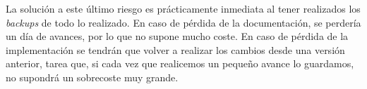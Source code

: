 \begin{enumerate}
	La soluci\'{o}n a este \'{u}ltimo riesgo es pr\'{a}cticamente inmediata al tener realizados los \textit{backups} de todo lo realizado. En caso de p\'{e}rdida de la documentaci\'{o}n, se perder\'{i}a un d\'{i}a de avances, por lo que no supone mucho coste. En caso de p\'{e}rdida de la implementaci\'{o}n se tendr\'{a}n que volver a realizar los cambios desde una versi\'{o}n anterior, tarea que, si cada vez que realicemos un peque\~{n}o avance lo guardamos, no supondr\'{a} un sobrecoste muy grande.
	
\end{enumerate}